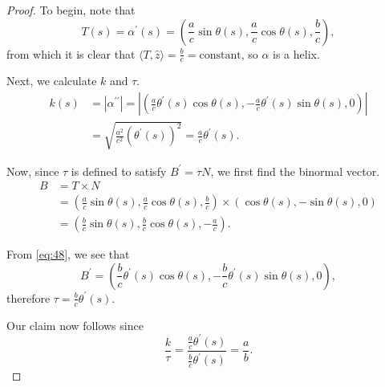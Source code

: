 \documentclass[12pt]{article}
\newenvironment{problem}[2][Problem]{\begin{trivlist}
    \item[\hskip \labelsep {\bfseries #1}\hskip \labelsep {\bfseries #2.}]}{\end{trivlist}}
\theoremstyle{definition}
\begin{document}
\begin{problem}{1.5.17}
\begin{enumerate}[label=(\alph*)]
\begin{proof}
            To begin, note that
            \begin{equation}
            \label{eq:45}
            T(s) = \alpha^{\prime}(s) = (\frac{a}{c}\sin\theta(s), \frac{a}{c}\cos\theta(s), \frac{b}{c}),
            \end{equation}
            from which it is clear that \( \langle T, \hat{z} \rangle = \frac{b}{c} = \text{constant}\), so \(\alpha\) is a helix.

            Next, we calculate \( k \) and \( \tau \).
            \begin{align}
            \label{eq:46}
              k(s) &= \left| \alpha^{\prime\prime} \right| = \left| (\frac{a}{c} \theta^{\prime}(s) \cos\theta(s), -\frac{a}{c} \theta^{\prime}(s) \sin\theta(s), 0 ) \right| \\
              &= \sqrt{\frac{a^2}{c^2}(\theta^{\prime}(s))^2} = \frac{a}{c} \theta^{\prime}(s).
            \end{align}

            Now, since \(\tau\) is defined to satisfy \( B^{\prime} = \tau N \), we first find the binormal vector.
            \begin{align}
            \label{eq:48}
              B &= T \times N \\
                &= (\frac{a}{c}\sin\theta(s), \frac{a}{c}\cos\theta(s), \frac{b}{c}) \times (\cos\theta(s), -\sin\theta(s), 0) \\
              & = (\frac{b}{c}\sin\theta(s), \frac{b}{c}\cos\theta(s), - \frac{a}{c}).
            \end{align}

            From \cref{eq:48}, we see that
            \begin{equation}
            \label{eq:49}
            B^{\prime} = (\frac{b}{c}\theta^{\prime}(s) \cos\theta(s), -\frac{b}{c}\theta^{\prime}(s) \sin \theta(s), 0),
            \end{equation}
            therefore \( \tau = \frac{b}{c} \theta^{\prime}(s) \).

            Our claim now follows since
            \begin{equation}
            \label{eq:50}
            \frac{k}{\tau} = \frac{\frac{a}{c} \theta^{\prime}(s)}{\frac{b}{c}\theta^{\prime}(s)} = \frac{a}{b}.
            \end{equation}
          \end{proof}
  \end{enumerate}
\end{problem}
\end{document}
